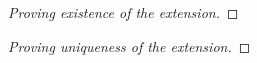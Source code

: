 \documentclass{article}
\newcommand{\1}[1]{\mathbbm{1}_{#1}}
\begin{document}
\begin{proof}[Proving existence of the extension]
\end{proof}

\begin{proof}[Proving uniqueness of the extension]
\end{proof}
\end{document}
